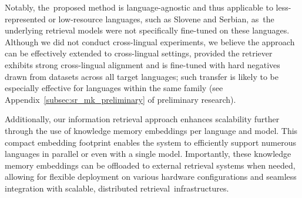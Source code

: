 \documentclass[make,article,accept,pdftex,moreauthors]{Definitions/mdpi}
\begin{document}

Notably, the~proposed method is language-agnostic and thus applicable to less-represented or low-resource languages, such as Slovene and Serbian, as~the underlying retrieval models were not specifically fine-tuned on these languages. 
Although we did not conduct cross-lingual experiments, we believe the approach can be effectively extended to cross-lingual settings, provided the retriever exhibits strong cross-lingual alignment and is fine-tuned with hard negatives drawn from datasets across all target languages; such transfer is likely to be especially effective for languages within the same family (see Appendix~\ref{subsec:sr_mk_preliminary} of preliminary research).

Additionally, our information retrieval approach enhances scalability further through the use of knowledge memory embeddings per language and model. 
This compact embedding footprint enables the system to efficiently support numerous languages in parallel or even with a single model. 
Importantly, these knowledge memory embeddings can be offloaded to external retrieval systems when needed, allowing for flexible deployment on various hardware configurations and seamless integration with scalable, distributed retrieval~infrastructures.

\end{document}
